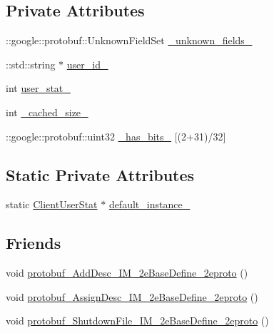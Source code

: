 \subsection*{Private Attributes}
\begin{DoxyCompactItemize}
\item 
\+::google\+::protobuf\+::\+Unknown\+Field\+Set \hyperlink{class_i_m_1_1_base_define_1_1_client_user_stat_a4e1f0ef9d7dd72b0bc50af747bdb2f9a}{\+\_\+unknown\+\_\+fields\+\_\+}
\item 
\+::std\+::string $\ast$ \hyperlink{class_i_m_1_1_base_define_1_1_client_user_stat_a36a355c54537e21c0b7c3f6ccc341aad}{user\+\_\+id\+\_\+}
\item 
int \hyperlink{class_i_m_1_1_base_define_1_1_client_user_stat_adfb5dc6d7b60c4ac240ef877449388b6}{user\+\_\+stat\+\_\+}
\item 
int \hyperlink{class_i_m_1_1_base_define_1_1_client_user_stat_a9324eed38a4ce8985a70ae04765b7567}{\+\_\+cached\+\_\+size\+\_\+}
\item 
\+::google\+::protobuf\+::uint32 \hyperlink{class_i_m_1_1_base_define_1_1_client_user_stat_ac5238c92a5cb06f0d2bfb98917fa6b96}{\+\_\+has\+\_\+bits\+\_\+} \mbox{[}(2+31)/32\mbox{]}
\end{DoxyCompactItemize}
\subsection*{Static Private Attributes}
\begin{DoxyCompactItemize}
\item 
static \hyperlink{class_i_m_1_1_base_define_1_1_client_user_stat}{Client\+User\+Stat} $\ast$ \hyperlink{class_i_m_1_1_base_define_1_1_client_user_stat_a82852cf6290d46d4c8fbc168faae8a46}{default\+\_\+instance\+\_\+}
\end{DoxyCompactItemize}
\subsection*{Friends}
\begin{DoxyCompactItemize}
\item 
void \hyperlink{class_i_m_1_1_base_define_1_1_client_user_stat_a9e69e602ccebaa03e642ca43da69b2eb}{protobuf\+\_\+\+Add\+Desc\+\_\+\+I\+M\+\_\+2e\+Base\+Define\+\_\+2eproto} ()
\item 
void \hyperlink{class_i_m_1_1_base_define_1_1_client_user_stat_a2c5118df3e7622ff896b422106a76fef}{protobuf\+\_\+\+Assign\+Desc\+\_\+\+I\+M\+\_\+2e\+Base\+Define\+\_\+2eproto} ()
\item 
void \hyperlink{class_i_m_1_1_base_define_1_1_client_user_stat_aa7f5f65378aed5daf4141184fe892bcf}{protobuf\+\_\+\+Shutdown\+File\+\_\+\+I\+M\+\_\+2e\+Base\+Define\+\_\+2eproto} ()
\end{DoxyCompactItemize}


